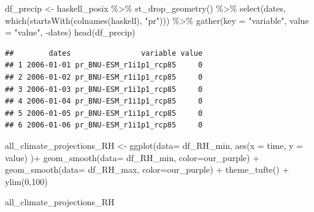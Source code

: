 \documentclass[
  paper=a4,
  ,captions=tableheading
]{scrartcl}
\newenvironment{Shaded}{\begin{snugshade}}{\end{snugshade}}
\newcommand{\AttributeTok}[1]{\textcolor[rgb]{0.77,0.63,0.00}{#1}}
\newcommand{\DecValTok}[1]{\textcolor[rgb]{0.00,0.00,0.81}{#1}}
\newcommand{\FunctionTok}[1]{\textcolor[rgb]{0.00,0.00,0.00}{#1}}
\newcommand{\NormalTok}[1]{#1}
\newcommand{\OtherTok}[1]{\textcolor[rgb]{0.56,0.35,0.01}{#1}}
\newcommand{\SpecialCharTok}[1]{\textcolor[rgb]{0.00,0.00,0.00}{#1}}
\newcommand{\StringTok}[1]{\textcolor[rgb]{0.31,0.60,0.02}{#1}}
\begin{document}
\begin{Shaded}
\begin{Highlighting}[]
\NormalTok{df\_precip }\OtherTok{\textless{}{-}}\NormalTok{ haskell\_posix }\SpecialCharTok{\%\textgreater{}\%}
  \FunctionTok{st\_drop\_geometry}\NormalTok{() }\SpecialCharTok{\%\textgreater{}\%}
  \FunctionTok{select}\NormalTok{(dates, }\FunctionTok{which}\NormalTok{(}\FunctionTok{startsWith}\NormalTok{(}\FunctionTok{colnames}\NormalTok{(haskell), }\StringTok{"pr"}\NormalTok{))) }\SpecialCharTok{\%\textgreater{}\%}
  \FunctionTok{gather}\NormalTok{(}\AttributeTok{key =} \StringTok{"variable"}\NormalTok{, }\AttributeTok{value =} \StringTok{"value"}\NormalTok{, }\SpecialCharTok{{-}}\NormalTok{dates)}
\FunctionTok{head}\NormalTok{(df\_precip)}
\end{Highlighting}
\end{Shaded}

\begin{verbatim}
##        dates                variable value
## 1 2006-01-01 pr_BNU-ESM_r1i1p1_rcp85     0
## 2 2006-01-02 pr_BNU-ESM_r1i1p1_rcp85     0
## 3 2006-01-03 pr_BNU-ESM_r1i1p1_rcp85     0
## 4 2006-01-04 pr_BNU-ESM_r1i1p1_rcp85     0
## 5 2006-01-05 pr_BNU-ESM_r1i1p1_rcp85     0
## 6 2006-01-06 pr_BNU-ESM_r1i1p1_rcp85     0
\end{verbatim}

\begin{Shaded}
\begin{Highlighting}[]
\NormalTok{all\_climate\_projections\_RH }\OtherTok{\textless{}{-}} \FunctionTok{ggplot}\NormalTok{(}\AttributeTok{data=}\NormalTok{ df\_RH\_min, }\FunctionTok{aes}\NormalTok{(}\AttributeTok{x =}\NormalTok{ time, }\AttributeTok{y =}\NormalTok{ value) )}\SpecialCharTok{+} 
  \FunctionTok{geom\_smooth}\NormalTok{(}\AttributeTok{data=}\NormalTok{ df\_RH\_min, }\AttributeTok{color=}\NormalTok{our\_purple) }\SpecialCharTok{+}
  \FunctionTok{geom\_smooth}\NormalTok{(}\AttributeTok{data=}\NormalTok{ df\_RH\_max, }\AttributeTok{color=}\NormalTok{our\_purple) }\SpecialCharTok{+}
  \FunctionTok{theme\_tufte}\NormalTok{() }\SpecialCharTok{+}
  \FunctionTok{ylim}\NormalTok{(}\DecValTok{0}\NormalTok{,}\DecValTok{100}\NormalTok{)}
  

\NormalTok{all\_climate\_projections\_RH}
\end{Highlighting}
\end{Shaded}
\end{document}
